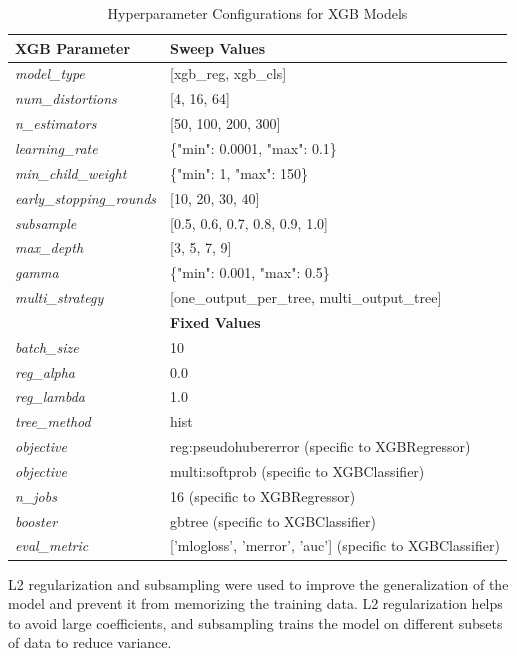  \begin{table}[ht]
    \centering
    \begin{tabular}{|l|l|}
        \hline
        \textbf{XGB Parameter} & \textbf{Sweep Values} \\
        \hline
        \textit{model\_type} & [xgb\_reg, xgb\_cls] \\
        \textit{num\_distortions} & [4, 16, 64] \\
        \textit{n\_estimators} & [50, 100, 200, 300] \\
        \textit{learning\_rate} & \{"min": 0.0001, "max": 0.1\} \\
        \textit{min\_child\_weight} & \{"min": 1, "max": 150\} \\
        \textit{early\_stopping\_rounds} & [10, 20, 30, 40] \\
        \textit{subsample} & [0.5, 0.6, 0.7, 0.8, 0.9, 1.0] \\
        \textit{max\_depth} & [3, 5, 7, 9] \\
        \textit{gamma} & \{"min": 0.001, "max": 0.5\} \\
        \textit{multi\_strategy} & [one\_output\_per\_tree, multi\_output\_tree]\\
        \hline
        \textbf{} & \textbf{Fixed Values} \\
        \hline
        \textit{batch\_size} & 10 \\
        \textit{reg\_alpha} & 0.0 \\
        \textit{reg\_lambda} & 1.0 \\
        \textit{tree\_method} & hist \\
        \textit{objective} & reg:pseudohubererror (specific to XGBRegressor)\\
        \textit{objective} & multi:softprob (specific to XGBClassifier)\\
        \textit{n\_jobs} & 16 (specific to XGBRegressor)\\
        \textit{booster} & gbtree (specific to XGBClassifier)\\
        \textit{eval\_metric} & ['mlogloss', 'merror', 'auc'] (specific to XGBClassifier)\\
        \hline
    \end{tabular}
    \caption{Hyperparameter Configurations for XGB Models}
    \label{table:xgb_hyperparams}
\end{table}
\vspace{\baselineskip}
\noindent
L2 regularization and subsampling were used to improve the generalization of the model and prevent it from memorizing the training data. L2 regularization helps to avoid large coefficients, and subsampling trains the model on different subsets of data to reduce variance. \par

